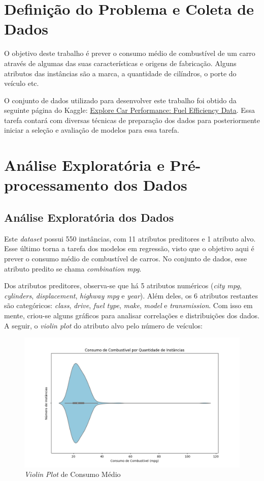 \documentclass{report}
\let\oldsection\section
\renewcommand\section{\clearpage\oldsection}
\begin{document}
\section{Definição do Problema e Coleta de Dados}

O objetivo deste trabalho é prever o consumo médio de combustível de um carro através de algumas das suas características e origens de fabricação.
Alguns atributos das instâncias são a marca, a quantidade de cilíndros, o porte do veículo etc.

O conjunto de dados utilizado para desenvolver este trabalho foi obtido da seguinte página do Kaggle:
\href{https://www.kaggle.com/datasets/arslaan5/explore-car-performance-fuel-efficiency-data}{Explore Car Performance: Fuel Efficiency Data}.
Essa tarefa contará com diversas técnicas de preparação dos dados para posteriormente iniciar a seleção e
avaliação de modelos para essa tarefa.

\section{Análise Exploratória e Pré-processamento dos Dados}

\subsection{Análise Exploratória dos Dados}

Este \textit{dataset} possui 550 instâncias, com 11 atributos preditores e 1 atributo alvo. Esse último torna a tarefa dos modelos em regressão,
visto que o objetivo aqui é prever o consumo médio de combustível de carros. No conjunto de dados, esse atributo predito se chama \textit{combination mpg}.

Dos atributos preditores, observa-se que há 5 atributos numéricos (\textit{city mpg}, \textit{cylinders}, \textit{displacement}, \textit{highway mpg} e \textit{year}).
Além deles, os 6 atributos restantes são categóricos: \textit{class}, \textit{drive}, \textit{fuel type}, \textit{make}, \textit{model} e \textit{transmission}.
Com isso em mente, criou-se alguns gráficos para analisar correlações e distribuições dos dados. A seguir, o \textit{violin plot}
do atributo alvo pelo número de veículos:

\begin{figure}[h!]
  \centering
  \includegraphics[width=.85\linewidth]{images/plots/violin_plots/pure_combination_mpg.png}
  \caption{\label{img:combination_dist} \textit{Violin Plot} de Consumo Médio}
\end{figure}
\end{document}
